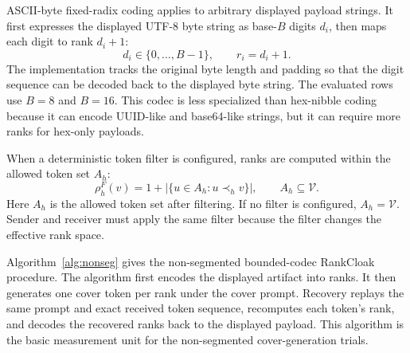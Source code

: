 \documentclass[fleqn,10pt]{wlscirep}
\begin{document}
ASCII-byte fixed-radix coding applies to arbitrary displayed payload strings. It first expresses the displayed UTF-8 byte string as base-\(B\) digits \(d_i\), then maps each digit to rank \(d_i+1\):
\begin{equation}
d_i\in\{0,\ldots,B-1\},
\qquad
r_i=d_i+1.
\label{eq:ascii-radix-map}
\end{equation}
The implementation tracks the original byte length and padding so that the digit sequence can be decoded back to the displayed byte string. The evaluated rows use \(B=8\) and \(B=16\). This codec is less specialized than hex-nibble coding because it can encode UUID-like and base64-like strings, but it can require more ranks for hex-only payloads.

When a deterministic token filter is configured, ranks are computed within the allowed token set \(A_h\):
\begin{equation}
\rho^F_h(v)=1+\left|\{u\in A_h:u\prec_h v\}\right|,
\qquad
A_h\subseteq\mathcal V.
\label{eq:filtered-rank}
\end{equation}
Here \(A_h\) is the allowed token set after filtering. If no filter is configured, \(A_h=\mathcal V\). Sender and receiver must apply the same filter because the filter changes the effective rank space.

Algorithm~\ref{alg:nonseg} gives the non-segmented bounded-codec RankCloak procedure. The algorithm first encodes the displayed artifact into ranks. It then generates one cover token per rank under the cover prompt. Recovery replays the same prompt and exact received token sequence, recomputes each token's rank, and decodes the recovered ranks back to the displayed payload. This algorithm is the basic measurement unit for the non-segmented cover-generation trials.
\end{document}
